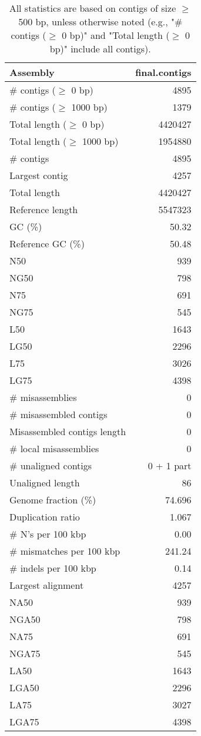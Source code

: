 \documentclass[12pt,a4paper]{article}
\begin{document}
\begin{table}[ht]
\begin{center}
\caption{All statistics are based on contigs of size $\geq$ 500 bp, unless otherwise noted (e.g., "\# contigs ($\geq$ 0 bp)" and "Total length ($\geq$ 0 bp)" include all contigs).}
\begin{tabular}{|l*{1}{|r}|}
\hline
Assembly & final.contigs \\ \hline
\# contigs ($\geq$ 0 bp) & 4895 \\ \hline
\# contigs ($\geq$ 1000 bp) & 1379 \\ \hline
Total length ($\geq$ 0 bp) & 4420427 \\ \hline
Total length ($\geq$ 1000 bp) & 1954880 \\ \hline
\# contigs & 4895 \\ \hline
Largest contig & 4257 \\ \hline
Total length & 4420427 \\ \hline
Reference length & 5547323 \\ \hline
GC (\%) & 50.32 \\ \hline
Reference GC (\%) & 50.48 \\ \hline
N50 & 939 \\ \hline
NG50 & 798 \\ \hline
N75 & 691 \\ \hline
NG75 & 545 \\ \hline
L50 & 1643 \\ \hline
LG50 & 2296 \\ \hline
L75 & 3026 \\ \hline
LG75 & 4398 \\ \hline
\# misassemblies & 0 \\ \hline
\# misassembled contigs & 0 \\ \hline
Misassembled contigs length & 0 \\ \hline
\# local misassemblies & 0 \\ \hline
\# unaligned contigs & 0 + 1 part \\ \hline
Unaligned length & 86 \\ \hline
Genome fraction (\%) & 74.696 \\ \hline
Duplication ratio & 1.067 \\ \hline
\# N's per 100 kbp & 0.00 \\ \hline
\# mismatches per 100 kbp & 241.24 \\ \hline
\# indels per 100 kbp & 0.14 \\ \hline
Largest alignment & 4257 \\ \hline
NA50 & 939 \\ \hline
NGA50 & 798 \\ \hline
NA75 & 691 \\ \hline
NGA75 & 545 \\ \hline
LA50 & 1643 \\ \hline
LGA50 & 2296 \\ \hline
LA75 & 3027 \\ \hline
LGA75 & 4398 \\ \hline
\end{tabular}
\end{center}
\end{table}
\end{document}
